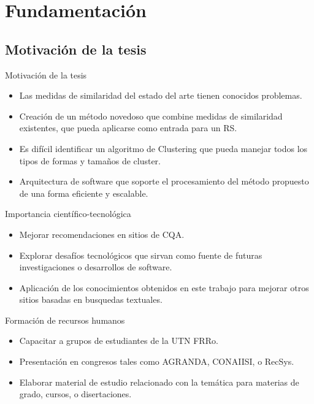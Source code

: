 \section{Fundamentación}

\subsection{Motivación de la tesis}
\begin{frame}{Motivación de la tesis}
	\begin{itemize} [<+>]
		\item Las medidas de similaridad del estado del arte tienen conocidos problemas.
		\item Creación de un método novedoso que combine medidas de similaridad existentes, que pueda aplicarse como entrada para un RS.
		\item Es difícil identificar un algoritmo de Clustering que pueda manejar todos los tipos de formas y tamaños de cluster.
		\item Arquitectura de software que soporte el procesamiento del método propuesto de una forma eficiente y escalable.
	\end{itemize}
\end{frame}

\begin{frame}{Importancia científico-tecnológica}
	\begin{itemize} [<+>]
		\item Mejorar recomendaciones en sitios de CQA.
		\item Explorar desafíos tecnológicos que sirvan como fuente de futuras investigaciones o desarrollos de software.
		\item Aplicación de los conocimientos obtenidos en este trabajo para mejorar otros sitios basadas en busquedas textuales.
	\end{itemize}
\end{frame}

\begin{frame}{Formación de recursos humanos}
	\begin{itemize} [<+>]
		\item Capacitar a grupos de estudiantes de la UTN FRRo.
		\item Presentación en congresos tales como AGRANDA, CONAIISI, o RecSys.
		\item Elaborar material de estudio relacionado con la temática para materias de grado, cursos, o disertaciones.
	\end{itemize}
\end{frame}